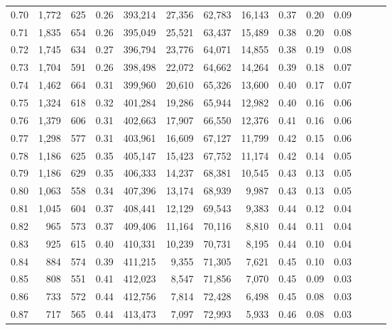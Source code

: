 \begin{tabular}{rrrrrrrrrrrrrr}
0.70 &   1,772 &    625 &  0.26 &  393,214 &   27,356 &  62,783 &  16,143 &  0.37 &  0.20 &      0.09 \\
0.71 &   1,835 &    654 &  0.26 &  395,049 &   25,521 &  63,437 &  15,489 &  0.38 &  0.20 &      0.08 \\
0.72 &   1,745 &    634 &  0.27 &  396,794 &   23,776 &  64,071 &  14,855 &  0.38 &  0.19 &      0.08 \\
0.73 &   1,704 &    591 &  0.26 &  398,498 &   22,072 &  64,662 &  14,264 &  0.39 &  0.18 &      0.07 \\
0.74 &   1,462 &    664 &  0.31 &  399,960 &   20,610 &  65,326 &  13,600 &  0.40 &  0.17 &      0.07 \\
0.75 &   1,324 &    618 &  0.32 &  401,284 &   19,286 &  65,944 &  12,982 &  0.40 &  0.16 &      0.06 \\
0.76 &   1,379 &    606 &  0.31 &  402,663 &   17,907 &  66,550 &  12,376 &  0.41 &  0.16 &      0.06 \\
0.77 &   1,298 &    577 &  0.31 &  403,961 &   16,609 &  67,127 &  11,799 &  0.42 &  0.15 &      0.06 \\
0.78 &   1,186 &    625 &  0.35 &  405,147 &   15,423 &  67,752 &  11,174 &  0.42 &  0.14 &      0.05 \\
0.79 &   1,186 &    629 &  0.35 &  406,333 &   14,237 &  68,381 &  10,545 &  0.43 &  0.13 &      0.05 \\
0.80 &   1,063 &    558 &  0.34 &  407,396 &   13,174 &  68,939 &   9,987 &  0.43 &  0.13 &      0.05 \\
0.81 &   1,045 &    604 &  0.37 &  408,441 &   12,129 &  69,543 &   9,383 &  0.44 &  0.12 &      0.04 \\
0.82 &     965 &    573 &  0.37 &  409,406 &   11,164 &  70,116 &   8,810 &  0.44 &  0.11 &      0.04 \\
0.83 &     925 &    615 &  0.40 &  410,331 &   10,239 &  70,731 &   8,195 &  0.44 &  0.10 &      0.04 \\
0.84 &     884 &    574 &  0.39 &  411,215 &    9,355 &  71,305 &   7,621 &  0.45 &  0.10 &      0.03 \\
0.85 &     808 &    551 &  0.41 &  412,023 &    8,547 &  71,856 &   7,070 &  0.45 &  0.09 &      0.03 \\
0.86 &     733 &    572 &  0.44 &  412,756 &    7,814 &  72,428 &   6,498 &  0.45 &  0.08 &      0.03 \\
0.87 &     717 &    565 &  0.44 &  413,473 &    7,097 &  72,993 &   5,933 &  0.46 &  0.08 &      0.03 \\

\end{tabular}
